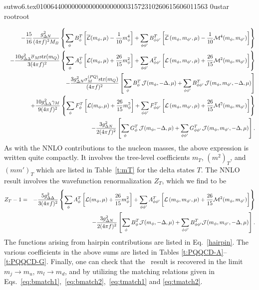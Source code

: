                                                                                                                                                                                                                                                                                       sutwo6.tex                                                                                          0100644 0000000 0000000 00000315723 10260615606 011563  0                                                                                                    ustar   root                            root                                                                                                                                                                                                                   \documentclass[prd,amssymb,amsmath,showpacs,nofootinbib,superscriptaddress]{revtex4}
\begin{document}
{\begin{eqnarray}
&& - 
\frac{15}{16} \frac{g_{{\Delta} N}^2}{(4 \pi f)^2 M_B}  
\left\{
\sum_\phi B_\phi^T 
\left[ 
{\overline{{\mathcal L}}}(m_\phi,\mu)
- \frac{1}{10} m_\phi^4
\right]
+ 
\sum_{\phi\phi'} B_{\phi\phi'}^T
\left[
{\overline{{\mathcal L}}}\left( m_\phi, m_{\phi'}, \mu \right)
-
\frac{1}{10} \mathcal{M}^4(m_\phi, m_{\phi'})
\right]
\right\}
\notag \\
&& -
\frac{10 g_{{\Delta} {\Delta}}^2 {\overline{\sigma}}_M \text{str}(m_Q)}{3 (4 \pi f)^2} 
\left\{
\sum_\phi A_\phi^T 
\left[ 
{\mathcal L}(m_\phi,\mu) + \frac{26}{15} m_\phi^2
\right]
+ 
\sum_{\phi \phi'} A_{\phi\phi'}^T 
\left[
{\mathcal L} \left( m_\phi, m_{\phi'}, \mu \right)
+ 
\frac{26}{15} \mathcal{M}^2 (m_\phi, m_{\phi'})
\right]
\right\}
\notag \\
&&- 
\frac{3 g_{{\Delta} N}^2 \sigma_M^{(PQ)} \text{str}(m_Q) }{(4 \pi f)^2} 
\left[
\sum_\phi B_\phi^T  \, {\mathcal J} (m_\phi,-{\Delta},\mu)
+
\sum_{\phi\phi'} B_{\phi\phi'}^T \, {\mathcal J}(m_\phi,m_{\phi'},-{\Delta},\mu)
\right]
\notag \\
&& + \frac{10 g_{{\Delta} {\Delta}}^2 {\gamma}_M}{9 (4 \pi f)^2}
	  \left\{ \sum_\phi F_\phi^T
	   \left[ {\mathcal L}(m_\phi,\mu) + \frac{26}{15} m_\phi^2  \right]
	 + \sum_{\phi \phi'} F_{\phi\phi'}^T 
	     \left[ {\mathcal L} \left(m_\phi, m_{\phi'}, \mu \right) 
	     +  \frac{26}{15} \mathcal{M}^2(m_\phi, m_{\phi'}) \right] \right\} \notag \\
&&- 
\frac{3 g_{{\Delta} N}^2 }{2 (4 \pi f)^2} 
\left[
\sum_\phi G_\phi^T  \, {\mathcal J} (m_\phi,-{\Delta},\mu)
+
\sum_{\phi\phi'} G_{\phi\phi'}^T \, {\mathcal J}(m_\phi,m_{\phi'},-{\Delta},\mu)
\right]
\label{eq:MPQNNLO}
.\end{eqnarray}}
As with the NNLO contributions to the nucleon masses, the above expression is written quite compactly. 
It involves the tree-level coefficients $m_T$, $(m^2)_T$, and $(mm')_T$
which are listed in Table~\ref{t:mT} for the delta states $T$. 
The NNLO result involves the wavefunction renormalization $Z_T$, which 
we find to be
{\small
\begin{eqnarray}
Z_T - 1 &=& - \frac{5 g_{{\Delta} {\Delta}}^2}{3 (4 \pi f)^2} 
\left\{
\sum_\phi A_\phi^T 
\left[ {\mathcal L}(m_\phi,\mu) + \frac{26}{15} m_\phi^2 \right]
+ 
\sum_{\phi\phi'} A_{\phi\phi'}^T 
\left[
{\mathcal L} \left( m_\phi,m_{\phi'},\mu \right) 
+
\frac{26}{15} \mathcal{M}^2(m_\phi, m_{\phi'})
\right]
\right\}
\notag \\
&&- \frac{3 g_{{\Delta} N}^2}{2 (4 \pi f)^2} 
\left[
\sum_\phi B_\phi^T  {\mathcal J} (m_\phi,-{\Delta},\mu)
+
\sum_{\phi\phi'} B_{\phi\phi'}^T {\mathcal J}(m_\phi,m_{\phi'},-{\Delta},\mu)
\right].
\label{eq:PQwfn}
\end{eqnarray}}
The functions arising from hairpin contributions are listed in Eq.~\eqref{hairpin}. 
The various coefficients in the above sums are listed in Tables \ref{t:PQQCD-A}--\ref{t:PQQCD-G}. 
Finally, one can check that the \CPT\ result is recovered in the limit $m_j \to m_u$, $m_l \to m_d$, and by utilizing the matching relations given in Eqs.~\eqref{eq:bmatch1},~\eqref{eq:bmatch2},~\eqref{eq:tmatch1} and \eqref{eq:tmatch2}. 
\end{document}
